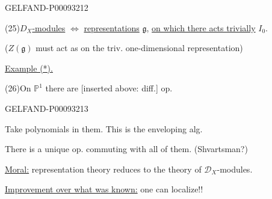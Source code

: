 \begin{GelfandAdjacentEvidence}{GELFAND-P000932}{12}


(25)\quad \underline{$D_X$-modules} $\Leftrightarrow$ \underline{representations} $\mathfrak g$,
\underline{on which there acts trivially} $I_0$.

($Z(\mathfrak g)$ must act as on the triv. one-dimensional representation)

\underline{Example (*).}

(26)\quad On $\mathbb P^1$ there are [inserted above: diff.] op.
\end{GelfandAdjacentEvidence}
\begin{GelfandAdjacentEvidence}{GELFAND-P000932}{13}

Take polynomials in them. This is the enveloping alg.

There is a unique op. commuting with all of them. (Shvartsman?)
\end{GelfandAdjacentEvidence}


\underline{Moral:} representation theory reduces to the theory of $\mathcal D_X$-modules.

\underline{Improvement over what was known:} one can localize!!

